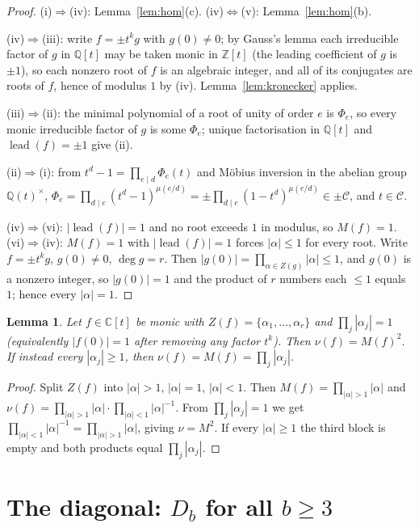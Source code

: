 \documentclass[11pt]{article}
\newtheorem{lemma}[theorem]{Lemma}
\theoremstyle{definition}
\DeclareMathOperator{\lead}{lead}
\newcommand{\ZZ}{\mathbb{Z}}
\newcommand{\QQ}{\mathbb{Q}}
\newcommand{\CC}{\mathbb{C}}
\begin{document}
\begin{proof}
(i)$\Rightarrow$(iv): Lemma~\ref{lem:hom}(c). (iv)$\Leftrightarrow$(v): Lemma~\ref{lem:hom}(b).

(iv)$\Rightarrow$(iii): write $f=\pm t^{k}g$ with $g(0)\ne0$; by Gauss's lemma each irreducible
factor of $g$ in $\QQ[t]$ may be taken monic in $\ZZ[t]$ (the leading coefficient of $g$ is
$\pm1$), so each nonzero root of $f$ is an algebraic integer, and all of its conjugates are roots
of $f$, hence of modulus $1$ by (iv). Lemma~\ref{lem:kronecker} applies.

(iii)$\Rightarrow$(ii): the minimal polynomial of a root of unity of order $e$ is $\Phi_e$, so
every monic irreducible factor of $g$ is some $\Phi_e$; unique factorisation in $\QQ[t]$ and
$\lead(f)=\pm1$ give (ii).

(ii)$\Rightarrow$(i): from $t^{d}-1=\prod_{e\mid d}\Phi_e(t)$ and M\"obius inversion in the
abelian group $\QQ(t)^\times$,
$\Phi_e=\prod_{d\mid e}(t^{d}-1)^{\mu(e/d)}
       =\pm\prod_{d\mid e}(1-t^{d})^{\mu(e/d)}\in\pm\mathcal{C}$,
and $t\in\mathcal{C}$.

(iv)$\Rightarrow$(vi): $|\lead(f)|=1$ and no root exceeds $1$ in modulus, so $M(f)=1$.
(vi)$\Rightarrow$(iv): $M(f)=1$ with $|\lead(f)|=1$ forces $|\alpha|\le1$ for every root. Write
$f=\pm t^{k}g$, $g(0)\ne0$, $\deg g=r$. Then $|g(0)|=\prod_{\alpha\in Z(g)}|\alpha|\le1$, and
$g(0)$ is a nonzero integer, so $|g(0)|=1$ and the product of $r$ numbers each $\le1$ equals $1$;
hence every $|\alpha|=1$.
\end{proof}

\begin{lemma}\label{lem:numsq}
Let $f\in\CC[t]$ be monic with $Z(f)=\{\alpha_1,\dots,\alpha_r\}$ and $\prod_j|\alpha_j|=1$
(equivalently $|f(0)|=1$ after removing any factor $t^{k}$). Then $\nu(f)=M(f)^{2}$.
If instead every $|\alpha_j|\ge1$, then $\nu(f)=M(f)=\prod_j|\alpha_j|$.
\end{lemma}

\begin{proof}
Split $Z(f)$ into $|\alpha|>1$, $|\alpha|=1$, $|\alpha|<1$. Then
$M(f)=\prod_{|\alpha|>1}|\alpha|$ and
$\nu(f)=\prod_{|\alpha|>1}|\alpha|\cdot\prod_{|\alpha|<1}|\alpha|^{-1}$. From
$\prod_{j}|\alpha_j|=1$ we get $\prod_{|\alpha|<1}|\alpha|^{-1}=\prod_{|\alpha|>1}|\alpha|$,
giving $\nu=M^{2}$. If every $|\alpha|\ge1$ the third block is empty and both products equal
$\prod_j|\alpha_j|$.
\end{proof}

\section{The diagonal: $D_b$ for all $b\ge3$}
\end{document}
